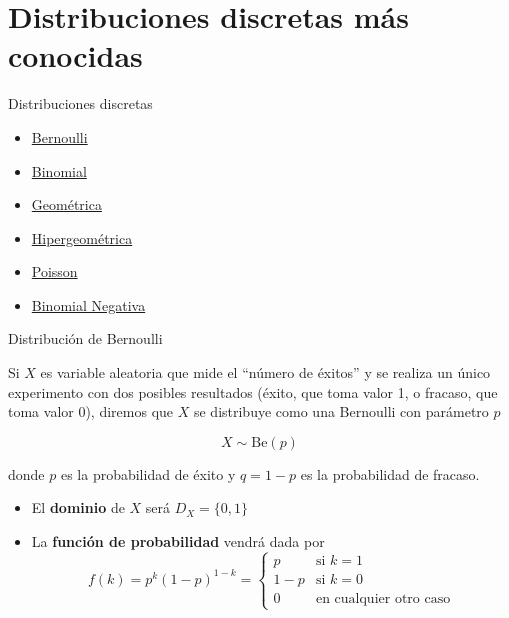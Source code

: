 \documentclass[
  ignorenonframetext,
]{beamer}
\providecommand{\tightlist}{%
  \setlength{\itemsep}{0pt}\setlength{\parskip}{0pt}}
\begin{document}
\hypertarget{distribuciones-discretas-muxe1s-conocidas}{%
\section{Distribuciones discretas más
conocidas}\label{distribuciones-discretas-muxe1s-conocidas}}

\begin{frame}{Distribuciones discretas}
\protect\hypertarget{distribuciones-discretas}{}

\begin{itemize}
\tightlist
\item
  \href{https://es.wikipedia.org/wiki/Distribución_de_Bernoulli}{Bernoulli}
\item
  \href{https://es.wikipedia.org/wiki/Distribución_binomial}{Binomial}
\item
  \href{https://es.wikipedia.org/wiki/Distribución_geométrica}{Geométrica}
\item
  \href{https://es.wikipedia.org/wiki/Distribución_hipergeométrica}{Hipergeométrica}
\item
  \href{https://es.wikipedia.org/wiki/Distribución_de_Poisson}{Poisson}
\item
  \href{https://es.wikipedia.org/wiki/Distribución_binomial_negativa}{Binomial
  Negativa}
\end{itemize}

\end{frame}

\begin{frame}{Distribución de Bernoulli}
\protect\hypertarget{distribuciuxf3n-de-bernoulli}{}

Si \(X\) es variable aleatoria que mide el ``número de éxitos'' y se
realiza un único experimento con dos posibles resultados (éxito, que
toma valor 1, o fracaso, que toma valor 0), diremos que \(X\) se
distribuye como una Bernoulli con parámetro \(p\)

\[X\sim \text{Be}(p)\]

donde \(p\) es la probabilidad de éxito y \(q = 1-p\) es la probabilidad
de fracaso.

\begin{itemize}
\tightlist
\item
  El \textbf{dominio} de \(X\) será \(D_X = \{0,1\}\)
\item
  La \textbf{función de probabilidad} vendrá dada por
  \[f(k) = p^k(1-p)^{1-k} =  \left\{
  \begin{array}{rl}
     p & \text{si } k=1 
  \\ 1-p & \text{si } k=0
  \\ 0 & \text{en cualquier otro caso}
  \end{array}
  \right.\]
\end{itemize}

\end{frame}
\end{document}
